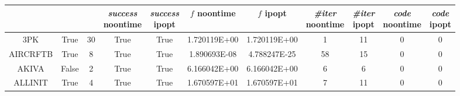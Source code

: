 \begin{longtable}{ccccccccccc}
	\label{tab:fullresults}\\
	\toprule
	\thead{\textit{name}}&
	\thead{\textit{bounds}}&
	\thead{\textit{n}}&
	\thead{\textit{success} \\ {\tiny noontime}}&
	\thead{\textit{success} \\ {\tiny ipopt}}&
	\thead{$f$ \\ {\tiny noontime}}& 
	\thead{$f$ \\ {\tiny ipopt}}&
	\thead{\textit{\#iter} \\ {\tiny noontime}}&
	\thead{\textit{\#iter} \\ {\tiny ipopt}}&
	\thead{\textit{code} \\ {\tiny noontime}}&
	\thead{\textit{code} \\ {\tiny ipopt}} \\
	\midrule
	\endhead
	\cellcolor{default1} 3PK& \cellcolor{default1} True& \cellcolor{default1} 30& \cellcolor{default1} True& \cellcolor{default1} True& \cellcolor{best} 1.720119E+00& \cellcolor{ok} 1.720119E+00& \cellcolor{best} 1& \cellcolor{poor} 11& \cellcolor{default1} 0& \cellcolor{default1} 0\\
	\cellcolor{default2} AIRCRFTB& \cellcolor{default2} True& \cellcolor{default2} 8& \cellcolor{default2} True& \cellcolor{default2} True& \cellcolor{ok} 1.890693E-08& \cellcolor{best} 4.788247E-25& \cellcolor{poor} 58& \cellcolor{best} 15& \cellcolor{default2} 0& \cellcolor{default2} 0\\
	\cellcolor{default1} AKIVA& \cellcolor{default1} False& \cellcolor{default1} 2& \cellcolor{default1} True& \cellcolor{default1} True& \cellcolor{ok} 6.166042E+00& \cellcolor{best} 6.166042E+00& \cellcolor{best} 6& \cellcolor{best} 6& \cellcolor{default1} 0& \cellcolor{default1} 0\\
	\cellcolor{default2} ALLINIT& \cellcolor{default2} True& \cellcolor{default2} 4& \cellcolor{default2} True& \cellcolor{default2} True& \cellcolor{best} 1.670597E+01& \cellcolor{ok} 1.670597E+01& \cellcolor{best} 7& \cellcolor{ok} 11& \cellcolor{default2} 0& \cellcolor{default2} 0\\

\end{longtable}
